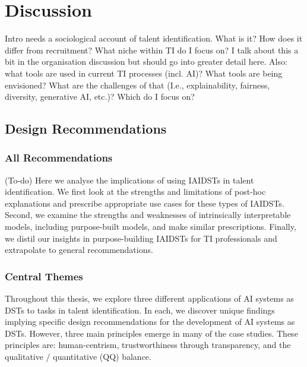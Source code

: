 

\chapter{\label{ch:discussion}Discussion}

\minitoc
Intro needs a sociological account of talent identification. What is it? How does it differ from recruitment? What niche within TI do I focus on? I talk about this a bit in the organisation discussion but should go into greater detail here.
Also: what tools are used in current TI processes (incl. AI)? What tools are being envisioned? What are the challenges of that (I.e., explainability, fairness, diversity, generative AI, etc.)? Which do I focus on?

\section{Design Recommendations}
\subsection{All Recommendations}
(To-do) Here we analyse the implications of using IAIDSTs in talent identification. We first look at the strengths and limitations of post-hoc explanations and prescribe appropriate use cases for these types of IAIDSTs. Second, we examine the strengths and weaknesses of intrinsically interpretable models, including purpose-built models, and make similar prescriptions. Finally, we distil our insights in purpose-building IAIDSTs for TI professionals and extrapolate to general recommendations.

\subsection{Central Themes}
Throughout this thesis, we explore three different applications of AI systems as DSTs to tasks in talent identification. In each, we discover unique findings implying specific design recommendations for the development of AI systems as DSTs. However, three main principles emerge in many of the case studies. These principles are: human-centrism, trustworthiness through transparency, and the qualitative / quantitative (QQ) balance.

